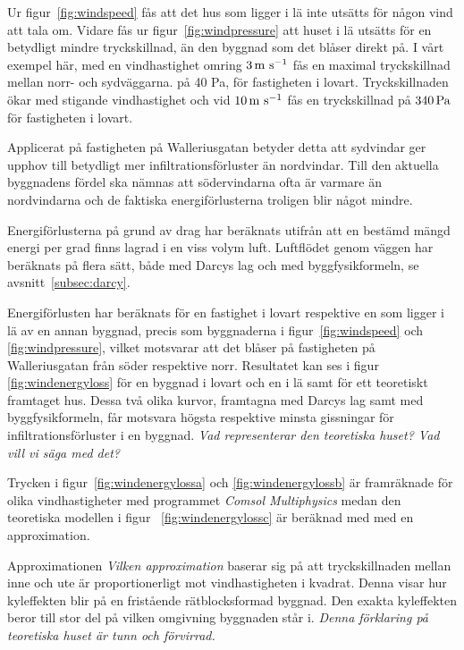 Ur figur~\ref{fig:windspeed} fås att det hus som ligger i lä inte utsätts för någon vind att tala om.
 Vidare fås ur figur~\ref{fig:windpressure} att huset i lä utsätts för en betydligt mindre 
 tryckskillnad, än den byggnad som det blåser direkt på. I vårt exempel här, med en 
 vindhastighet omring $\unit[3]{m~s^{-1}}$ fås en maximal tryckskillnad mellan norr- och sydväggarna.
 på 40 Pa, för fastigheten i lovart. Tryckskillnaden ökar med stigande vindhastighet och vid $\unit[10]{m~s^{-1}}$ fås en 
 tryckskillnad på $\unit[340]{Pa}$ för fastigheten i lovart. 

Applicerat på fastigheten på Walleriusgatan betyder detta att sydvindar ger upphov till 
betydligt mer infiltrationsförluster än nordvindar. Till den aktuella byggnadens fördel ska nämnas 
att södervindarna ofta är varmare än nordvindarna och de faktiska energiförlusterna 
troligen blir något mindre.


Energiförlusterna på grund av drag har beräknats utifrån att en bestämd mängd energi per grad finns lagrad i en viss volym luft. Luftflödet genom väggen har beräknats på flera sätt, både med Darcys lag och med byggfysikformeln, se avsnitt~\ref{subsec:darcy}.

Energiförlusten har beräknats
  för en fastighet i lovart respektive en som ligger i lä av en annan byggnad, precis som 
  byggnaderna i figur~\ref{fig:windspeed} och \ref{fig:windpressure}, vilket motsvarar att det 
  blåser på fastigheten på Walleriusgatan från söder respektive norr. Resultatet kan ses i figur~
  \ref{fig:windenergyloss} för en byggnad i lovart och en i lä samt för ett teoretiskt framtaget hus. Dessa två olika kurvor, framtagna med Darcys lag samt med byggfysikformeln, får motsvara högsta respektive minsta gissningar för infiltrationsförluster i en byggnad. \emph{\color{red} Vad representerar den teoretiska huset? Vad vill vi säga med det?}

Trycken i figur~\ref{fig:windenergylossa} och \ref{fig:windenergylossb} är framräknade för 
olika vindhastigheter med programmet \emph{Comsol Multiphysics} medan den teoretiska modellen i figur~
\ref{fig:windenergylossc} är beräknad med med en approximation. 

Approximationen\emph{\color{red} Vilken approximation} baserar sig på att tryckskillnaden mellan inne och ute är proportionerligt mot vindhastigheten i kvadrat. Denna visar hur kyleffekten blir på en fristående rätblocksformad byggnad. Den exakta kyleffekten beror till stor del på vilken omgivning byggnaden står i. \emph{\color{red} Denna förklaring på teoretiska huset är tunn och förvirrad.}


